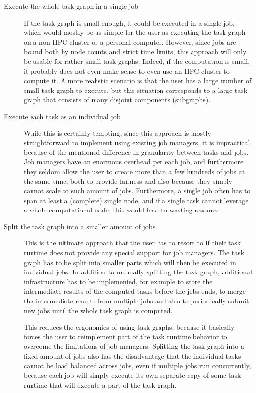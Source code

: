 \begin{description}
    \item[Execute the whole task graph in a single job] If the task graph is small enough, it
    could be executed in a single job, which would mostly be as simple for the user as executing
    the task graph on a non-HPC cluster or a personal computer. However, since jobs are bound
    both by node counts and strict time limits, this approach will only be usable for rather
    small task graphs. Indeed, if the computation is small, it probably does not even make sense
    to even use an HPC cluster to compute it. A more realistic scenario is that the user has a
    large number of small task graph to execute, but this situation corresponds to a large task
    graph that consists of many disjoint components (subgraphs).
    \item[Execute each task as an individual job] While this is certainly tempting, since this
    approach is mostly straightforward to implement using existing job managers, it is
    impractical because of the mentioned difference in granularity between tasks and jobs.
    Job managers have an enormous overhead per each job, and furthermore they seldom allow the
    user to create more than a few hundreds of jobs at the same time, both to provide fairness and
    also because they simply cannot scale to such amount of jobs. Furthermore, a single job
    often has to span at least a (complete) single node, and if a single task cannot leverage a
    whole computational node, this would lead to wasting resource.
    \item[Split the task graph into a smaller amount of jobs] This is the ultimate approach that
    the
    user has to resort to if their task runtime does not provide any special support for job
    managers. The task graph has to be split into smaller parts which will then be executed in
    individual jobs. In addition to manually splitting the task graph, additional infrastructure
    has to be implemented, for example to store the intermediate results of the computed tasks
    before the jobs ends, to merge the intermediate results from multiple jobs and also to
    periodically submit new jobs until the whole task graph is computed.

    This reduces the ergonomics of using task graphs, because it basically forces the user to
    reimplement part of the task runtime behavior to overcome the limitations of job managers.
    Splitting the task graph into a fixed amount of jobs also has the disadvantage that the
    individual tasks cannot be load balanced across jobs, even if multiple jobs run
    concurrently, because each job will simply execute its own separate copy of some task
    runtime that will execute a part of the task graph.
\end{description}

